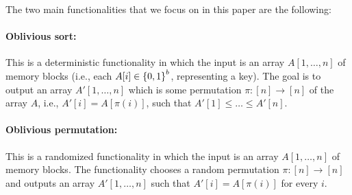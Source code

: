 The two main functionalities that we focus on in this paper are the following:

\paragraph{Oblivious sort:}
This is a deterministic functionality in which the input is an array $A[1,\ldots,n]$ of memory blocks (i.e., each $A[i] \in {\{0,1\}}^{b}$, representing a key). The goal is to output an array $A'[1,\ldots,n]$ which is some permutation $\pi:[n] \rightarrow [n]$ of the array $A$, i.e., $A'[i] = A[\pi(i)]$, such that $A'[1]\leq \ldots \leq A'[n]$. %

\paragraph{Oblivious permutation:} 
This is a randomized functionality in which the input is an array $A[1,\ldots,n]$ of memory blocks. The functionality chooses a random permutation $\pi:[n] \rightarrow [n]$ and outputs an array $A'[1,\ldots,n]$ such that $A'[i] = A[\pi(i)]$ for every $i$. %


